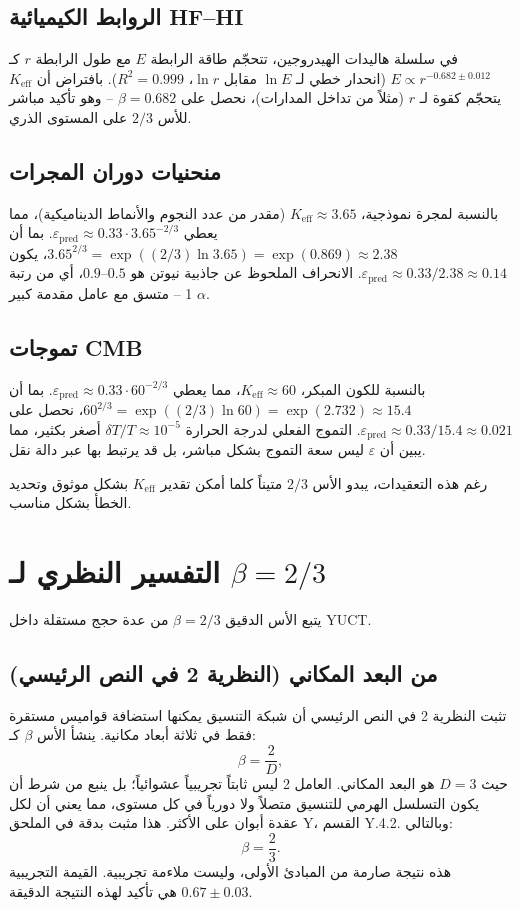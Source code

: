 \documentclass[11pt,a4paper]{article}
\newcommand{\ar}[1]{\foreignlanguage{arabic}{#1}}
\newcommand{\Keff}{K_{\mathrm{eff}}}
\newcommand{\eps}{\varepsilon}
\begin{document}
	\subsection*{\ar{الروابط الكيميائية HF–HI}}
	\ar{في سلسلة هاليدات الهيدروجين، تتحجّم طاقة الرابطة \(E\) مع طول الرابطة \(r\) كـ \(E \propto r^{-0.682 \pm 0.012}\) (انحدار خطي لـ \(\ln E\) مقابل \(\ln r\)، \(R^2 = 0.999\)). بافتراض أن \(\Keff\) يتحجّم كقوة لـ \(r\) (مثلاً من تداخل المدارات)، نحصل على \(\beta = 0.682\) – وهو تأكيد مباشر للأس \(2/3\) على المستوى الذري.}
	
	\subsection*{\ar{منحنيات دوران المجرات}}
	\ar{بالنسبة لمجرة نموذجية، \(\Keff \approx 3.65\) (مقدر من عدد النجوم والأنماط الديناميكية)، مما يعطي \(\eps_{\text{pred}} \approx 0.33 \cdot 3.65^{-2/3}\). بما أن \(3.65^{2/3} = \exp((2/3)\ln 3.65) = \exp(0.869) \approx 2.38\)، يكون \(\eps_{\text{pred}} \approx 0.33/2.38 \approx 0.14\). الانحراف الملحوظ عن جاذبية نيوتن هو \(0.5\)–\(0.9\)، أي من رتبة 1 – متسق مع عامل مقدمة كبير \(\alpha\).}
	
	\subsection*{\ar{تموجات CMB}}
	\ar{بالنسبة للكون المبكر، \(\Keff \approx 60\)، مما يعطي \(\eps_{\text{pred}} \approx 0.33 \cdot 60^{-2/3}\). بما أن \(60^{2/3} = \exp((2/3)\ln 60) = \exp(2.732) \approx 15.4\)، نحصل على \(\eps_{\text{pred}} \approx 0.33/15.4 \approx 0.021\). التموج الفعلي لدرجة الحرارة \(\delta T/T \approx 10^{-5}\) أصغر بكثير، مما يبين أن \(\eps\) ليس سعة التموج بشكل مباشر، بل قد يرتبط بها عبر دالة نقل.}
	
	\ar{رغم هذه التعقيدات، يبدو الأس \(2/3\) متيناً كلما أمكن تقدير \(\Keff\) بشكل موثوق وتحديد الخطأ بشكل مناسب.}
	
	\section{\ar{التفسير النظري لـ \(\beta = 2/3\)}}
	\label{sec:derivation}
	
	\ar{يتبع الأس الدقيق \(\beta = 2/3\) من عدة حجج مستقلة داخل YUCT.}
	
	\subsection*{\ar{من البعد المكاني (النظرية 2 في النص الرئيسي)}}
	\ar{تثبت النظرية 2 في النص الرئيسي أن شبكة التنسيق يمكنها استضافة قواميس مستقرة فقط في ثلاثة أبعاد مكانية. ينشأ الأس \(\beta\) كـ:}
	\[
	\beta = \frac{2}{D},
	\]
	\ar{حيث \(D = 3\) هو البعد المكاني. العامل 2 ليس ثابتاً تجريبياً عشوائياً؛ بل ينبع من شرط أن يكون التسلسل الهرمي للتنسيق متصلاً ولا دورياً في كل مستوى، مما يعني أن لكل عقدة أبوان على الأكثر. هذا مثبت بدقة في الملحق Y، القسم Y.4.2. وبالتالي:}
	\[
	\beta = \frac{2}{3}.
	\]
	\ar{هذه نتيجة صارمة من المبادئ الأولى، وليست ملاءمة تجريبية. القيمة التجريبية \(0.67 \pm 0.03\) هي تأكيد لهذه النتيجة الدقيقة.}
	
\end{document}

